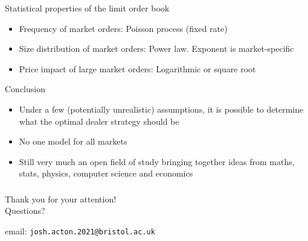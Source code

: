 \documentclass{beamer} %
\begin{document}
\begin{frame}{Statistical properties of the limit order book}
    \begin{itemize}
        \item Frequency of market orders: Poisson process (fixed rate)
        \item Size distribution of market orders: Power law. Exponent is market-specific
        \item Price impact of large market orders: Logarithmic or square root
    \end{itemize}
\end{frame}

\begin{frame}{Conclusion}
    \begin{itemize}
        \item Under a few (potentially unrealistic) assumptions, it is
        possible to determine what the optimal dealer strategy should be
        \item No one model for all markets
        \item Still very much an open field of study bringing together ideas
        from maths, stats, physics, computer science and economics
    \end{itemize}
\end{frame}

\begin{frame}
    \frametitle{}
    \begin{center}
        \large{Thank you for your attention!}\\
        \vspace{1cm}
        Questions?
        \vspace{2cm}

        email: \texttt{josh.acton.2021@bristol.ac.uk}
    \end{center}
\end{frame}
\end{document}
